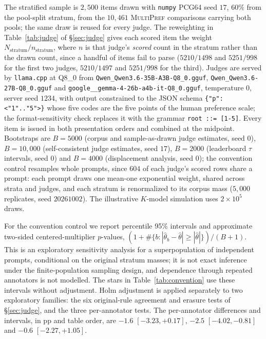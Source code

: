 \documentclass{article}
\begin{document}
The stratified sample is $2{,}500$ items drawn with
\texttt{numpy} PCG64 seed $17$, $60\%$ from the pool-split stratum, from the $10{,}461$
\textsc{MultiPref} comparisons carrying both pools; the same draw is reused for every
judge. The reweighting in Table~\ref{tab:judge} of \S\ref{sec:judge} gives each scored item the weight
$N_{\text{stratum}}/n_{\text{stratum}}$, where $n$ is that judge's \emph{scored} count in the
stratum rather than the drawn count, since a handful of items fail to parse
($5210/1498$ and $5251/998$ for the first two judges, $5210/1497$ and $5251/998$ for the
third). Judges are served by \texttt{llama.cpp} at Q8\_0 from
\texttt{Qwen\_Qwen3.6-35B-A3B-Q8\_0.gguf},
\texttt{Qwen\_Qwen3.6-27B-Q8\_0.gguf} and
\texttt{google\_\_gemma-4-26b-a4b-it-Q8\_0.gguf}, temperature $0$, server seed $1234$, with
output constrained to the JSON schema
\texttt{\{"p": <"1".."5">\}} whose five codes are the five points of the human preference
scale; the format-sensitivity check replaces it with the grammar
\texttt{root ::= [1-5]}. Every item is issued in both presentation orders and combined at
the midpoint. Bootstraps are $B=5000$ (corpus and sample-as-drawn judge estimates, seed
$0$), $B=10{,}000$ (self-consistent judge estimates, seed $17$), $B=2000$ (leaderboard
$\tau$ intervals, seed $0$) and $B=4000$ (displacement analysis, seed $0$); the convention
control resamples whole prompts, since $604$ of each judge's scored rows share a prompt:
each prompt draws one mean-one exponential weight, shared across strata and judges, and
each stratum is renormalized to its corpus mass ($5{,}000$ replicates, seed $20261002$).
The illustrative
$K$-model simulation uses $2\times10^{5}$ draws.

For the convention control we report percentile 95\% intervals and approximate two-sided
centered-multiplier $p$-values, $(1 + \#\{b : |\hat\theta_b - \hat\theta| \ge |\hat\theta|\})/(B + 1)$.
This is an exploratory sensitivity analysis for a superpopulation of independent prompts,
conditional on the original stratum masses; it is not exact inference under the
finite-population sampling design, and dependence through repeated annotators is not
modelled. The stars in Table~\ref{tab:convention} use these intervals without adjustment.
Holm adjustment is applied separately to two exploratory families: the six original-rule
agreement and erasure tests of \S\ref{sec:judge}, and the three per-annotator tests. The
per-annotator differences and intervals, in pp and table order, are $-1.6$ $[-3.23, +0.17]$,
$-2.5$ $[-4.02, -0.81]$ and $-0.6$ $[-2.27, +1.05]$.
\end{document}
